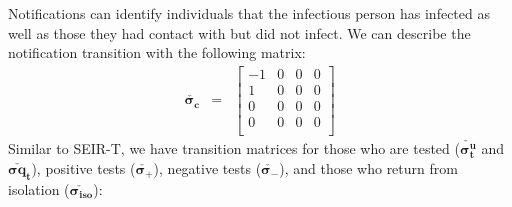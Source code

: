 \documentclass[notitlepage, superscriptaddress]{revtex4-2}
\begin{document}
Notifications can identify individuals that the infectious person has infected as well as those they had contact with but did not infect. We can describe the notification transition with the following matrix:
\begin{eqnarray} 
\boldsymbol{\check{\sigma_{c}}} &=& 
    \begin{bmatrix}
    -1 & 0 & 0 & 0\\ 
    1 & 0 & 0 & 0\\
    0 & 0 & 0 & 0\\
    0 & 0 & 0 & 0\\
    \end{bmatrix}
\end{eqnarray}
Similar to SEIR-T, we have transition matrices for those who are tested ($\boldsymbol{\check{\sigma^{u}_{t}}}$ and $\boldsymbol{\check{\sigma{q}_{t}}}$), positive tests ($\boldsymbol{\check{\sigma_{+}}}$), negative tests ($\boldsymbol{\check{\sigma_{-}}}$), and those who return from isolation ($\boldsymbol{\check{\sigma_{iso}}}$):
\end{document}

